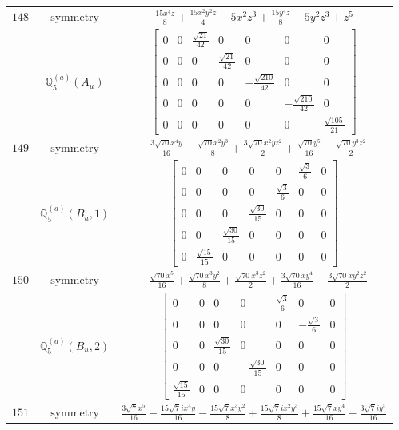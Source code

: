 \documentclass[fleqn,8pt,landscape]{jsarticle}
\begin{document}
\begin{longtable}{ccc}
$ 148 $ & $ \text{symmetry} $ & $ \frac{15 x^{4} z}{8} + \frac{15 x^{2} y^{2} z}{4} - 5 x^{2} z^{3} + \frac{15 y^{4} z}{8} - 5 y^{2} z^{3} + z^{5} $ \\
$  $ & $ \mathbb{Q}_{5}^{(a)}(A_{u}) $ & $ \begin{bmatrix} 0 & 0 & \frac{\sqrt{21}}{42} & 0 & 0 & 0 & 0 \\ 0 & 0 & 0 & \frac{\sqrt{21}}{42} & 0 & 0 & 0 \\ 0 & 0 & 0 & 0 & - \frac{\sqrt{210}}{42} & 0 & 0 \\ 0 & 0 & 0 & 0 & 0 & - \frac{\sqrt{210}}{42} & 0 \\ 0 & 0 & 0 & 0 & 0 & 0 & \frac{\sqrt{105}}{21} \end{bmatrix} $ \\ \hline
$ 149 $ & $ \text{symmetry} $ & $ - \frac{3 \sqrt{70} x^{4} y}{16} - \frac{\sqrt{70} x^{2} y^{3}}{8} + \frac{3 \sqrt{70} x^{2} y z^{2}}{2} + \frac{\sqrt{70} y^{5}}{16} - \frac{\sqrt{70} y^{3} z^{2}}{2} $ \\
$  $ & $ \mathbb{Q}_{5}^{(a)}(B_{u},1) $ & $ \begin{bmatrix} 0 & 0 & 0 & 0 & 0 & \frac{\sqrt{3}}{6} & 0 \\ 0 & 0 & 0 & 0 & \frac{\sqrt{3}}{6} & 0 & 0 \\ 0 & 0 & 0 & \frac{\sqrt{30}}{15} & 0 & 0 & 0 \\ 0 & 0 & \frac{\sqrt{30}}{15} & 0 & 0 & 0 & 0 \\ 0 & \frac{\sqrt{15}}{15} & 0 & 0 & 0 & 0 & 0 \end{bmatrix} $ \\ \hline
$ 150 $ & $ \text{symmetry} $ & $ - \frac{\sqrt{70} x^{5}}{16} + \frac{\sqrt{70} x^{3} y^{2}}{8} + \frac{\sqrt{70} x^{3} z^{2}}{2} + \frac{3 \sqrt{70} x y^{4}}{16} - \frac{3 \sqrt{70} x y^{2} z^{2}}{2} $ \\
$  $ & $ \mathbb{Q}_{5}^{(a)}(B_{u},2) $ & $ \begin{bmatrix} 0 & 0 & 0 & 0 & \frac{\sqrt{3}}{6} & 0 & 0 \\ 0 & 0 & 0 & 0 & 0 & - \frac{\sqrt{3}}{6} & 0 \\ 0 & 0 & \frac{\sqrt{30}}{15} & 0 & 0 & 0 & 0 \\ 0 & 0 & 0 & - \frac{\sqrt{30}}{15} & 0 & 0 & 0 \\ \frac{\sqrt{15}}{15} & 0 & 0 & 0 & 0 & 0 & 0 \end{bmatrix} $ \\ \hline
$ 151 $ & $ \text{symmetry} $ & $ \frac{3 \sqrt{7} x^{5}}{16} - \frac{15 \sqrt{7} i x^{4} y}{16} - \frac{15 \sqrt{7} x^{3} y^{2}}{8} + \frac{15 \sqrt{7} i x^{2} y^{3}}{8} + \frac{15 \sqrt{7} x y^{4}}{16} - \frac{3 \sqrt{7} i y^{5}}{16} $ \\

\end{longtable}
\end{document}
